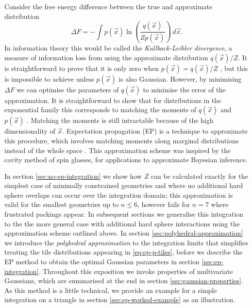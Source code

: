 \documentclass[11pt,twoside]{report}
\begin{document}
Consider the free energy difference between the true and approximate distribution
\begin{equation*}
  \Delta F
  =
  - \int p(\vec{x})
  \ln{\left( \frac{q(\vec{x})}{Z p(\vec{x})} \right)} \, d\vec{x}.
\end{equation*}
In information theory this would be called the \emph{Kullback-Leibler divergence}, a measure of information loss from using the approximate distribution $q(\vec{x})/Z$.
It is straightforward to prove that it is only zero when $p(\vec{x}) = q(\vec{x}) / Z$ \cite{MerminPR1965, EvansAP1979}, but this is impossible to achieve unless $p(\vec{x})$ is also Gaussian.
However, by minimising $\Delta F$ we can optimise the parameters of $q(\vec{x})$ to minimise the error of the approximation.
It is straightforward to show that for distributions in the exponential family this corresponds to matching the moments of $q(\vec{x})$ and $p(\vec{x})$ \cite{Minka2001,MinkaUAI2001,Rasmussen2006,Cunningham2011}.
Matching the moments is still intractable because of the high dimensionality of $\vec{x}$.
Expectation propagation (EP) is a technique to approximate this procedure, which involves matching moments along marginal distributions instead of the whole space \cite{Minka2001,MinkaUAI2001,Rasmussen2006,Cunningham2011}.
This approximation scheme was inspired by the cavity method of spin glasses, for applications to approximate Bayesian inference.

In section \ref{sec:no-ep-integration} we show how $Z$ can be calculated exactly for the simplest case of minimally constrained geometries and where no additional hard sphere overlaps can occur over the integration domain; this approximation is valid for the smallest geometries up to $n \le 6$, however fails for $n=7$ where frustrated packings appear.
In subsequent sections we generalise this integration to the the more general case with additional hard sphere interactions using the approximation scheme outlined above.
In section \ref{sec:polyhedral-approximation} we introduce the \emph{polyhedral approximation} to the integration limits that simplifies treating the tile distributions appearing in \eqref{eq:ep-p-tiles}, before we describe the EP method to obtain the optimal Gaussian parameters in section \ref{sec:ep-integration}.
Throughout this exposition we invoke properties of multivariate Gaussians, which are summarised at the end in section \ref{sec:gaussian-properties}.
As this method is a little technical, we provide an example for a simple integration on a triangle in section \ref{sec:ep-worked-example} as an illustration.
\end{document}
